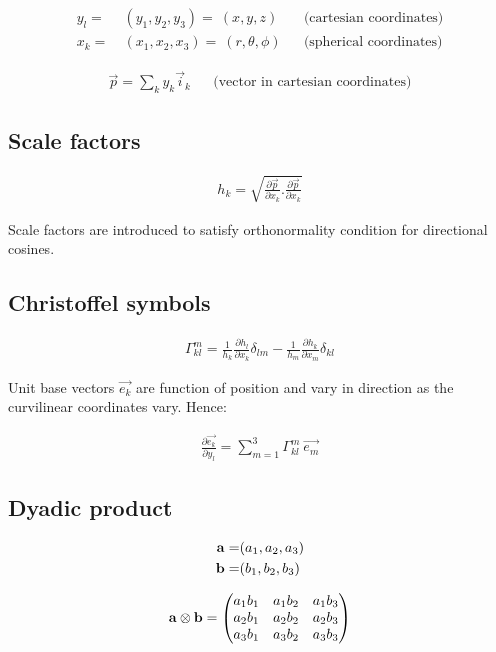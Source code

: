 \documentclass[11pt]{article}
\begin{document}
\begin{align}
y_l = & \ (y_1,y_2,y_3) = \ (x,y,z) && \mbox{(cartesian coordinates)} \\
x_k = & \ (x_1,x_2,x_3) = \ (r,\theta,\phi) && \mbox{(spherical coordinates)}
\end{align}

\begin{align}
\vec{p} = \sum_k y_k \vec{i}_k && \mbox{(vector in cartesian coordinates)}
\end{align}

\subsection{Scale factors}

\begin{align}
h_k = \sqrt{\frac{\partial \vec{p}}{\partial x_k}.\frac{\partial \vec{p}}{\partial x_k}}
\end{align}

\noindent
Scale factors are introduced to satisfy orthonormality condition for directional cosines.

\subsection{Christoffel symbols}

\begin{align}
\Gamma_{kl}^m = \frac{1}{h_k} \frac{\partial h_l}{\partial x_k} \delta_{lm} - \frac{1}{h_m}\frac{\partial h_k}{\partial x_m} \delta_{kl}
\end{align}

\noindent
Unit base vectors $\vec{e_k}$ are function of position and vary in direction as the curvilinear coordinates vary. Hence:

\begin{align}
\frac{\partial \vec{e_k}}{\partial y_l} = \sum_{m=1}^3 \Gamma_{kl}^m \ \vec{e_m}
\end{align}

\subsection{Dyadic product}

\begin{align}
{\bf{a}} = & (a_1,a_2,a_3) \\
{\bf{b}} = & (b_1,b_2,b_3)
\end{align}

\begin{align}
{\bf{a}} \otimes {\bf{b}} = 
       \begin{pmatrix}
 a_1 b_1 & a_1 b_2 & a_1 b_3 \\
 a_2 b_1 & a_2 b_2 & a_2 b_3 \\
 a_3 b_1 & a_3 b_2 & a_3 b_3 
       \end{pmatrix}
\end{align}
\end{document}
